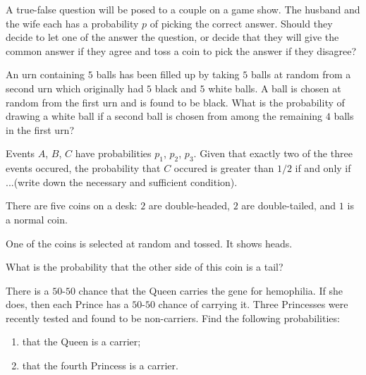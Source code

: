 \begin{problem}[Handout 4, \# 12]
  A true-false question will be posed to a couple on a game show. The
  husband and the wife each has a probability \(p\) of picking the correct
  answer. Should they decide to let one of the answer the question, or
  decide that they will give the common answer if they agree and toss a
  coin to pick the answer if they disagree?
\end{problem}
\begin{solution*}

\end{solution*}

\begin{problem}[Handout 4, \# 13]
  An urn containing \(5\) balls has been filled up by taking \(5\) balls at
  random from a second urn which originally had \(5\) black and \(5\) white
  balls. A ball is chosen at random from the first urn and is found to be
  black. What is the probability of drawing a white ball if a second ball
  is chosen from among the remaining \(4\) balls in the first urn?
\end{problem}
\begin{solution*}
\end{solution*}

\begin{problem}[Handout 4, \# 15]
  Events \(A\), \(B\), \(C\) have probabilities \(p_1\), \(p_2\),
  \(p_3\). Given that exactly two of the three events occured, the
  probability that \(C\) occured is greater than \(1/2\) if and only if
  ...\@ (write down the necessary and sufficient condition).
\end{problem}
\begin{solution*}
\end{solution*}

\begin{problem}[Handout 5, \# 1]
  There are five coins on a desk: \(2\) are double-headed, \(2\) are
  double-tailed, and \(1\) is a normal coin.

  \noindent One of the coins is selected at random and tossed. It shows
  heads.

  \noindent What is the probability that the other side of this coin is a
  tail?
\end{problem}
\begin{solution*}
\end{solution*}

\begin{problem}
  There is a \(50\)-\(50\) chance that the Queen carries the gene for
  hemophilia. If she does, then each Prince has a \(50\)-\(50\) chance of
  carrying it. Three Princesses were recently tested and found to be
  non-carriers. Find the following probabilities:
  \begin{enumerate}[label=(\alph*),noitemsep]
  \item that the Queen is a carrier;
  \item that the fourth Princess is a carrier.
  \end{enumerate}
\end{problem}
\begin{solution*}
\end{solution*}

